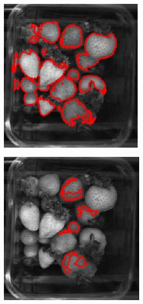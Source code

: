 \documentclass[fleqn,twoside]{article}
\begin{document}
\begin{figure}[ht]
	\begin{subfigure}{.30\textwidth}
		\centering
		\includegraphics[width=.9\linewidth]{over_light.jpg}
		\caption{}
		\label{fig:over_light}
	\end{subfigure}%
	\begin{subfigure}{.30\textwidth}
		\centering
		\includegraphics[width=.9\linewidth]{over_light_diff.jpg}

\end{subfigure}
\end{figure}
\end{document}
